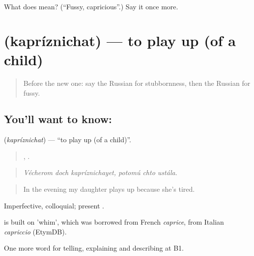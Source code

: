 \begin{tcolorbox}[breakable,colback=teal!4,colframe=teal!35!black,title={Before you move on}]
What does  mean? (\textquotedblleft{}Fussy, capricious\textquotedblright{}.) Say it once more.
\end{tcolorbox}
\section[\texorpdfstring{\ru{капризничать} (kapríznichat)}{капризничать (kapríznichat)}]{ (kapríznichat) — to play up (of a child)}

\label{lesson:RU-C478-kapriznichat}



\begin{quote}
Before the new one: say the Russian for stubbornness, then the Russian for fussy.
\end{quote}

\subsection*{You'll want to know: }
\textbf{} (\emph{kapríznichat}) — \textquotedblleft{}to play up (of a child)\textquotedblright{}.

\begin{quote}
  ,   .
\end{quote}

\begin{quote}
\emph{Vécherom doch kapríznichayet, potomú chto ustála.}
\end{quote}

\begin{quote}
In the evening my daughter plays up because she's tired.
\end{quote}

Imperfective, colloquial; present .

\begin{cousinweb}
\emph{} is built on \emph{} 'whim', which was borrowed from French \emph{caprice}, from Italian \emph{capriccio} (EtymDB).
\end{cousinweb}

\begin{grammarlens}[title={What you've built}]
One more word for telling, explaining and describing at B1.
\end{grammarlens}

